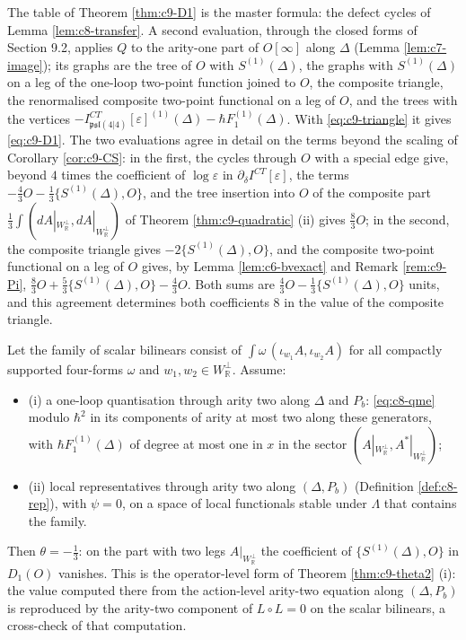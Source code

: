 \begin{remark}
\label{rem:c9-twoeval}
The table of Theorem \ref{thm:c9-D1} is the master formula: the defect cycles of Lemma \ref{lem:c8-transfer}. A second evaluation, through the closed forms of Section 9.2, applies $Q$ to the arity-one part of $O[\infty]$ along $\Delta$ (Lemma \ref{lem:c7-image}); its graphs are the tree of $O$ with $S^{(1)}(\Delta)$, the graphs with $S^{(1)}(\Delta)$ on a leg of the one-loop two-point function joined to $O$, the composite triangle, the renormalised composite two-point functional on a leg of $O$, and the trees with the vertices $-I^{CT}_{\mathfrak{psl}(4|4)}[\varepsilon]^{(1)}(\Delta)-\hbar F_1^{(1)}(\Delta)$. With \eqref{eq:c9-triangle} it gives \eqref{eq:c9-D1}. The two evaluations agree in detail on the terms beyond the scaling of Corollary \ref{cor:c9-CS}: in the first, the cycles through $O$ with a special edge give, beyond $4$ times the coefficient of $\log\varepsilon$ in $\partial_\delta I^{CT}[\varepsilon]$, the terms $-\tfrac43O-\tfrac13\{S^{(1)}(\Delta),O\}$, and the tree insertion into $O$ of the composite part $\tfrac13\int(dA|_{W_{\mathbb R}^\perp},dA|_{W_{\mathbb R}^\perp})$ of Theorem \ref{thm:c9-quadratic} (ii) gives $\tfrac83O$; in the second, the composite triangle gives $-2\{S^{(1)}(\Delta),O\}$, and the composite two-point functional on a leg of $O$ gives, by Lemma \ref{lem:c6-bvexact} and Remark \ref{rem:c9-Pi}, $\tfrac83O+\tfrac53\{S^{(1)}(\Delta),O\}-\tfrac43O$. Both sums are $\tfrac43O-\tfrac13\{S^{(1)}(\Delta),O\}$ units, and this agreement determines both coefficients $8$ in the value of the composite triangle.
\end{remark}

\begin{theorem}
\label{thm:c9-kappa}
Let the family of scalar bilinears consist of $\int\omega\,(\iota_{w_1}A,\iota_{w_2}A)$ for all compactly supported four-forms $\omega$ and $w_1,w_2\in W_{\mathbb R}^\perp$. Assume:
\begin{itemize}
\item (i) a one-loop quantisation through arity two along $\Delta$ and $P_b$: \eqref{eq:c8-qme} modulo $\hbar^2$ in its components of arity at most two along these generators, with $\hbar F_1^{(1)}(\Delta)$ of degree at most one in $x$ in the sector $(A|_{W_{\mathbb R}^\perp},A^*|_{W_{\mathbb R}^\perp})$;
\item (ii) local representatives through arity two along $(\Delta,P_b)$ (Definition \ref{def:c8-rep}), with $\psi=0$, on a space of local functionals stable under $\Lambda$ that contains the family.
\end{itemize}
Then $\theta=-\tfrac13$: on the part with two legs $A|_{W_{\mathbb R}^\perp}$ the coefficient of $\{S^{(1)}(\Delta),O\}$ in $D_1(O)$ vanishes. This is the operator-level form of Theorem \ref{thm:c9-theta2} (i): the value computed there from the action-level arity-two equation along $(\Delta,P_b)$ is reproduced by the arity-two component of $L\circ L=0$ on the scalar bilinears, a cross-check of that computation.
\end{theorem}

